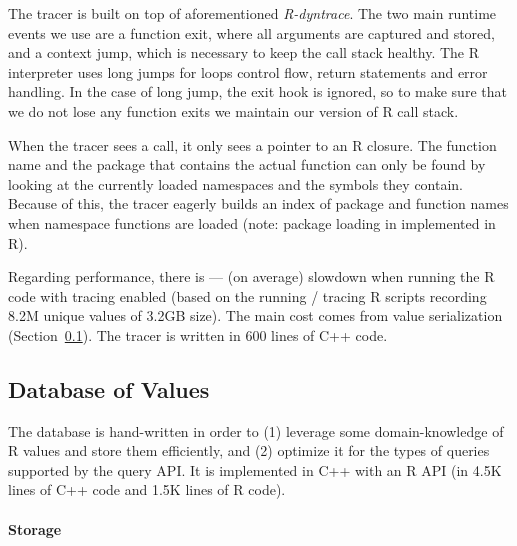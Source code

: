 \documentclass[sigplan,anonymous,review]{acmart}
\begin{document}
The tracer is built on top of aforementioned \emph{R-dyntrace}.
The two main runtime events we use are a function exit, where all arguments are captured and stored, and a context jump, which is necessary to keep the call stack healthy.
The R interpreter uses long jumps for loops control flow, return statements and error handling.
In the case of long jump, the exit hook is ignored, so to make sure that we do not lose any function exits we maintain our version of R call stack.

When the tracer sees a call, it only sees a pointer to an R closure.
The function name and the package that contains the actual function can only be found by looking at the currently loaded namespaces and the symbols they contain.
Because of this, the tracer eagerly builds an index of package and function names when namespace functions are loaded (note: package loading in implemented in R).

Regarding performance, there is \TRMinTracingOverhead --- \TRMaxTracingOverhead (\TRAvgTracingOverhead on average) slowdown when running the R code with tracing enabled (based on the running / tracing \TRTracingFiles R scripts recording 8.2M unique values of 3.2GB size).
The main cost comes from value serialization (\Cf Section~\ref{sec:sxpdb}).
The tracer is written in 600 lines of C++ code.

\subsection{Database of Values}\label{sec:sxpdb}

The database is hand-written in order to (1) leverage some domain-knowledge of R values and store them efficiently, and (2) optimize it for the types of queries supported by the query API.
It is implemented in C++ with an R API (in 4.5K lines of C++ code and 1.5K lines of R code).

\paragraph{Storage}
\end{document}
